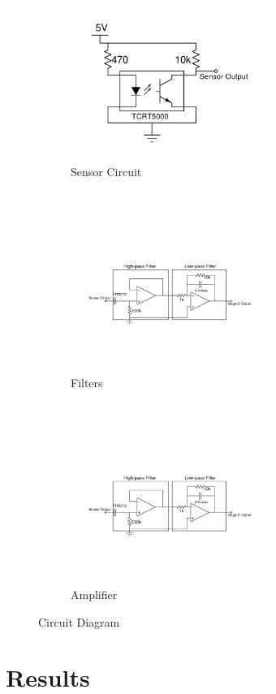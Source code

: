 \documentclass[12pt]{article}
\begin{document}
\begin{multicols}{2}
\begin{figure}[H]
    \centering
    \begin{subfigure}{\textwidth}
        \includegraphics[width=0.5\linewidth, height=5cm]{Sensor_Circuit.png} 
        \caption{Sensor Circuit}
    \end{subfigure}\\
    \begin{subfigure}{\textwidth}
        \includegraphics[width=0.5\linewidth, height=5cm]{Filters.png}
        \caption{Filters}
    \end{subfigure}\\
    \begin{subfigure}{\textwidth}
        \includegraphics[width=0.5\linewidth, height=5cm]{Filters.png}
        \caption{Amplifier}
    \end{subfigure}
    \caption{Circuit Diagram}
\end{figure}

\section{Results}


\end{multicols}
\end{document}
